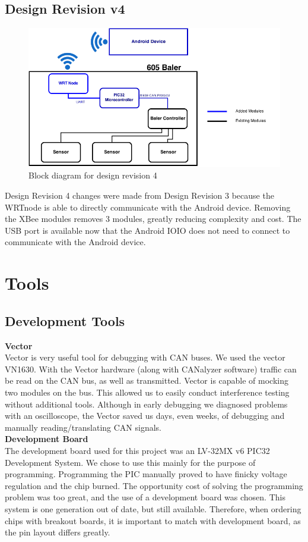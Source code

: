 \documentclass[paper=a4, fontsize=11pt]{scrartcl}
\numberwithin{equation}{section}		%
\numberwithin{figure}{section}			%
\numberwithin{table}{section}				%
\begin{document}
\subsection{Design Revision v4} 
 \begin{figure}[H]
	 \center\includegraphics[scale=0.4]{rev4.png}
 \caption{Block diagram for design revision 4}
 \end{figure}
Design Revision 4 changes were made from Design Revision 3 because the WRTnode is able to directly communicate with the Android device. Removing the XBee modules removes 3 modules, greatly reducing complexity and cost. The USB port is available now that the Android IOIO does not need to connect to communicate with the Android device.\\

\pagebreak
\section{Tools}
\subsection{Development Tools}
\textbf{Vector}\\
Vector is very useful tool for debugging with CAN buses. We used the vector VN1630. With the Vector hardware (along with CANalyzer software) traffic can be read on the CAN bus, as well as transmitted. Vector is capable of mocking two modules on the bus. This allowed us to easily conduct interference testing without additional tools. Although in early debugging we diagnosed problems with an oscilloscope, the Vector saved us days, even weeks, of debugging and manually reading/translating CAN signals.\\

\textbf{Development Board}\\
The development board used for this project was an LV-32MX v6 PIC32 Development System. We chose to use this mainly for the purpose of programming. Programming the PIC manually proved to have finicky voltage regulation and the chip burned. The opportunity cost of solving the programming problem was too great, and the use of a development board was chosen. This system is one generation out of date, but still available. Therefore, when ordering chips with breakout boards, it is important to match with development board, as the pin layout differs greatly.\\
\end{document}
